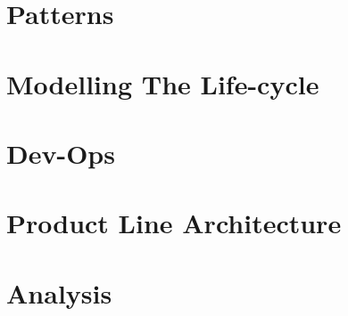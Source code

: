 \documentclass[a4paper]{article}
\begin{document}
\section{Patterns}

\section{Modelling The Life-cycle}

\section{Dev-Ops}

\section{Product Line Architecture}

\section{Analysis}
\end{document}
